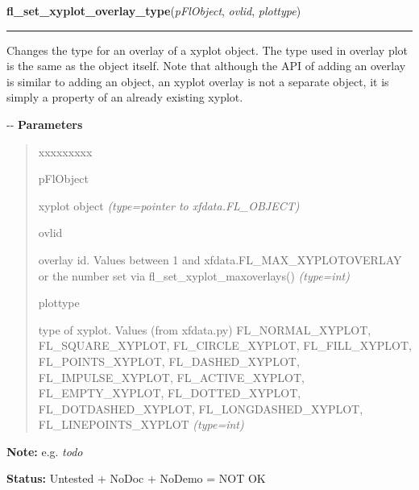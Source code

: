     \label{xformslib:flxyplot:fl_set_xyplot_overlay_type}

    \vspace{0.5ex}

\hspace{.8\funcindent}\begin{boxedminipage}{\funcwidth}

    \raggedright \textbf{fl\_set\_xyplot\_overlay\_type}(\textit{pFlObject}, \textit{ovlid}, \textit{plottype})

    \vspace{-1.5ex}

    \rule{\textwidth}{0.5\fboxrule}
\setlength{\parskip}{2ex}

Changes the type for an overlay of a xyplot object. The type used in
overlay plot is the same as the object itself. Note that although the API
of adding an overlay is similar to adding an object, an xyplot overlay is
not a separate object, it is simply a property of an already existing
xyplot.

-{}-
\setlength{\parskip}{1ex}
      \textbf{Parameters}
      \vspace{-1ex}

      \begin{quote}
        \begin{Ventry}{xxxxxxxxx}

          \item[pFlObject]


xyplot object
            {\it (type=pointer to xfdata.FL\_OBJECT)}

          \item[ovlid]


overlay id. Values between 1 and xfdata.FL\_MAX\_XYPLOTOVERLAY or the
number set via fl\_set\_xyplot\_maxoverlays()
            {\it (type=int)}

          \item[plottype]


type of xyplot.  Values (from xfdata.py) FL\_NORMAL\_XYPLOT,
FL\_SQUARE\_XYPLOT, FL\_CIRCLE\_XYPLOT, FL\_FILL\_XYPLOT,
FL\_POINTS\_XYPLOT, FL\_DASHED\_XYPLOT, FL\_IMPULSE\_XYPLOT,
FL\_ACTIVE\_XYPLOT, FL\_EMPTY\_XYPLOT, FL\_DOTTED\_XYPLOT,
FL\_DOTDASHED\_XYPLOT, FL\_LONGDASHED\_XYPLOT, FL\_LINEPOINTS\_XYPLOT
            {\it (type=int)}

        \end{Ventry}

      \end{quote}

\textbf{Note:} 
e.g. \emph{todo}


\textbf{Status:} 
Untested + NoDoc + NoDemo = NOT OK


    \end{boxedminipage}

